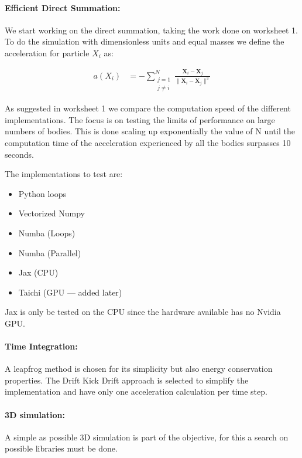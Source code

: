 \documentclass[a4paper, 11pt]{article}         %
\begin{document}
\paragraph{Efficient Direct Summation:}
We start working on the direct summation, taking the work done on worksheet 1.
To do the simulation with dimensionless units and equal masses we define the acceleration for particle $X_i$ as:

\begin{subequations}
\begin{align}
    a(X_i) &= -\sum_{\substack{j=1 \\ j \ne i}}^{N} \frac{\mathbf{X}_i - \mathbf{X}_j}{\|\mathbf{X}_i - \mathbf{X}_j\|^3} \label{eq:motion_b}
\end{align}
\end{subequations}

As suggested in worksheet 1 \parencite{ws1} we compare the computation speed of the different implementations.
The focus is on testing the limits of performance on large numbers of bodies. This is done scaling up exponentially the value of N until the computation time of the acceleration experienced by all the bodies  surpasses 10 seconds.

The implementations to test are:

\begin{itemize}
    \item Python loops
    \item Vectorized Numpy
    \item Numba (Loops)
    \item Numba (Parallel)
    \item Jax (CPU)
    \item Taichi (GPU --- added later)
\end{itemize}

Jax is only be tested on the CPU since the hardware available has no Nvidia GPU.

\paragraph{Time Integration:}
A leapfrog method is chosen for its simplicity but also energy conservation properties.
The Drift Kick Drift approach is selected to simplify the implementation and have only one acceleration calculation per time step.

\paragraph{3D simulation:}
A simple as possible 3D simulation is part of the objective, for this a search on possible libraries must be done.
\end{document}
